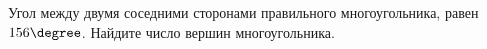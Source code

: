 \begin{ex}
	\begin{condition}
		Угол между двумя соседними сторонами правильного многоугольника, равен \( 156\degree\). Найдите число вершин многоугольника.
	\end{condition}
\end{ex}